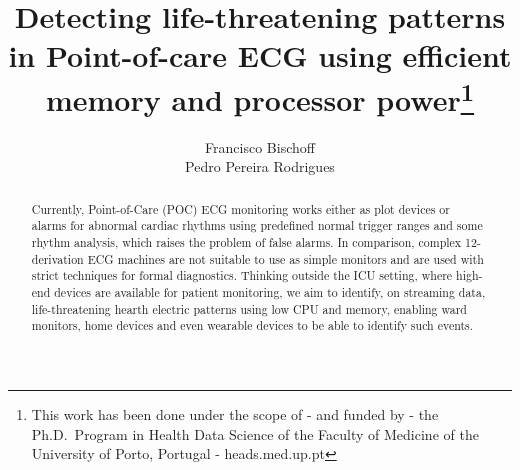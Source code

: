 \documentclass[runningheads]{llncs}
\begin{document}
%
\title{Detecting life-threatening patterns in Point-of-care ECG using efficient memory and processor power\thanks{This work has been done under the scope of - and funded by - the Ph.D.~Program in Health Data
Science of the Faculty of Medicine of the University of Porto, Portugal - heads.med.up.pt}}
%
%
%
\author{  Francisco Bischoff\\  Pedro Pereira Rodrigues }

%


\maketitle              %
%

\begin{abstract}
  Currently, Point-of-Care (POC) ECG monitoring works either as plot devices or alarms for abnormal
  cardiac rhythms using predefined normal trigger ranges and some rhythm analysis, which raises the
  problem of false alarms. In comparison, complex 12-derivation ECG machines are not suitable to use
  as simple monitors and are used with strict techniques for formal diagnostics. Thinking outside the
  ICU setting, where high-end devices are available for patient monitoring, we aim to identify, on
  streaming data, life-threatening hearth electric patterns using low CPU and memory, enabling ward
  monitors, home devices and even wearable devices to be able to identify such events.


\end{abstract}
%
%
\end{document}
